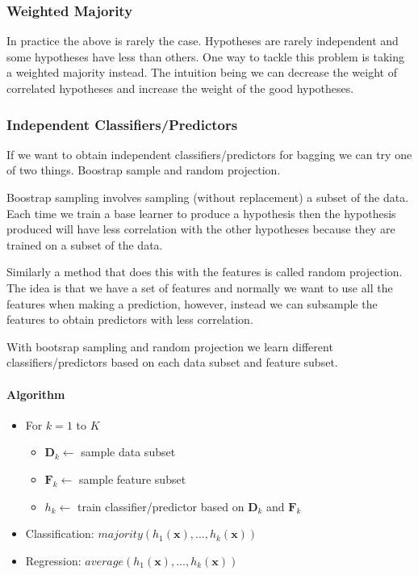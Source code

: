 \documentclass[12pt]{article}
\begin{document}
        \subsubsection{Weighted Majority}
            In practice the above is rarely the case. Hypotheses are rarely independent and some hypotheses have less
            than others. One way to tackle this problem is taking a weighted majority instead. The intuition being we
            can decrease the weight of correlated hypotheses and increase the weight of the good hypotheses.

        \subsubsection{Independent Classifiers/Predictors}
            If we want to obtain independent classifiers/predictors for bagging we can try one of two things. Boostrap
            sample and random projection. 
            
            Boostrap sampling involves sampling (without replacement) a subset of the
            data. Each time we train a base learner to produce a hypothesis then the hypothesis produced will have less
            correlation with the other hypotheses because they are trained on a subset of the data. 

            Similarly a method that does this with the features is called random projection. The idea is that we have a
            set of features and normally we want to use all the features when making a prediction, however, instead we
            can subsample the features to obtain predictors with less correlation. 

            With bootsrap sampling and random projection we learn different classifiers/predictors based on each data
            subset and feature subset. 

            \paragraph{Algorithm}
                \begin{itemize}
                    \item For $k=1$ to $K$
                    \begin{itemize}
                        \item $\boldsymbol{D}_k \leftarrow$ sample data subset
                        \item $\boldsymbol{F}_k \leftarrow$ sample feature subset
                        \item $h_k \leftarrow$ train classifier/predictor based on $\boldsymbol{D}_k$ and $\boldsymbol{F}_k$
                    \end{itemize}                    
                    \item Classification: $majority(h_1(\boldsymbol{x}), ..., h_k(\boldsymbol{x}))$
                    \item Regression: $average(h_1(\boldsymbol{x}), ..., h_k(\boldsymbol{x}))$
                \end{itemize}
\end{document}
